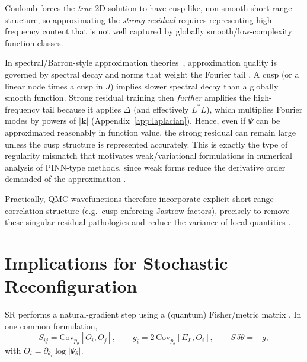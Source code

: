Coulomb forces the \emph{true} 2D solution to have cusp-like, non-smooth short-range
structure, so approximating the \emph{strong residual} requires representing
high-frequency content that is not well captured by globally smooth/low-complexity
function classes.

In spectral/Barron-style approximation theories~\cite{Barron1993-UniversalApprox}, approximation quality is governed
by spectral decay and norms that weight the Fourier tail \cite{De_Ryck_2024}.
A cusp (or a linear node times a cusp in $J$) implies slower spectral decay than a globally
smooth function.
Strong residual training then \emph{further} amplifies the high-frequency tail
because it applies $\Delta$ (and effectively $L^\ast L$), which multiplies Fourier
modes by powers of $|\mathbf k|$ (Appendix~\ref{app:laplacian}).
Hence, even if $\Psi$ can be approximated reasonably in function value, the strong
residual can remain large unless the cusp structure is represented accurately.
This is exactly the type of regularity mismatch that motivates weak/variational
formulations in numerical analysis of PINN-type methods, since weak forms reduce
the derivative order demanded of the approximation \cite{De_Ryck_2024}.

Practically, QMC wavefunctions therefore incorporate explicit short-range
correlation structure (e.g.\ cusp-enforcing Jastrow factors), precisely to remove
these singular residual pathologies and reduce the variance of local quantities
\cite{BeccaSorella2017-QMCBook,Siljamaki2003-QD-Cusps}.

\section{Implications for Stochastic Reconfiguration}
\label{app:coulomb:sr}

SR performs a natural-gradient step using a (quantum) Fisher/metric matrix
\cite{BeccaSorella2017-QMCBook,Amari1998-NaturalGradient,ParkKastoryano2020-GeometryNQS}.
In one common formulation,
\begin{equation}
S_{ij}=\mathrm{Cov}_{p_\theta}[O_i,O_j],
\qquad
g_i=2\,\mathrm{Cov}_{p_\theta}[E_L,O_i],
\qquad
S\,\delta\theta=-g,
\label{eq:coulomb:sr}
\end{equation}
with $O_i=\partial_{\theta_i}\log|\Psi_\theta|$.

